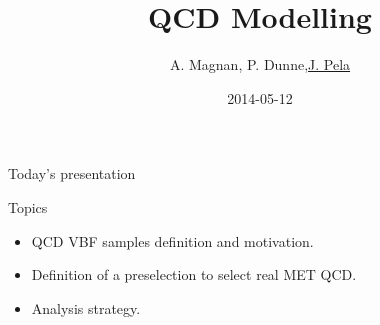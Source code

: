 \documentclass[8pt]{beamer}
\author[J. Pela]{A. Magnan, P. Dunne,\underline{J. Pela}}
\title{QCD Modelling}
\institute[ICL]{Imperial College London}
\date{2014-05-12}
\begin{document}
\setlength{\unitlength}{1mm}

\begin{frame}
  \titlepage
\end{frame}

\begin{frame}{Today's presentation}
 
\begin{block}{Topics}
 
\begin{itemize}
  \item QCD VBF samples definition and motivation.
  \item Definition of a preselection to select real MET QCD.
  \item Analysis strategy.
\end{itemize}

\end{block}

\end{frame}
\end{document}
